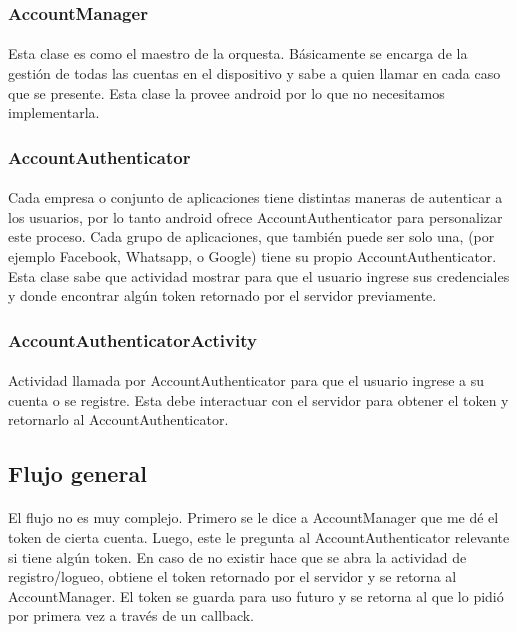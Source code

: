 \documentclass[10pt]{extarticle}
\begin{document}
\subsubsection{AccountManager}
\paragraph{}
Esta clase es como el maestro de la orquesta. Básicamente se encarga de la gestión de todas las cuentas en el dispositivo y sabe a quien llamar en cada caso que se presente. Esta clase la provee android por lo que no necesitamos implementarla.

\subsubsection{AccountAuthenticator}
\paragraph{}
Cada empresa o conjunto de aplicaciones tiene distintas maneras de autenticar a los usuarios, por lo tanto android ofrece AccountAuthenticator para personalizar este proceso. Cada grupo de aplicaciones, que también puede ser solo una, (por ejemplo Facebook, Whatsapp, o Google) tiene su propio AccountAuthenticator. Esta clase sabe que actividad mostrar para que el usuario ingrese sus credenciales y donde encontrar algún token retornado por el servidor previamente.

\subsubsection{AccountAuthenticatorActivity}
\paragraph{}
Actividad llamada por AccountAuthenticator para que el usuario ingrese a su cuenta o se registre. Esta debe interactuar con el servidor para obtener el token y retornarlo al AccountAuthenticator.


\subsection{Flujo general}

\paragraph{}
El flujo no es muy complejo. Primero se le dice a AccountManager que me dé el token de cierta cuenta. Luego, este le pregunta al AccountAuthenticator relevante si tiene algún token. En caso de no existir hace que se abra la actividad de registro/logueo, obtiene el token retornado por el servidor y se retorna al AccountManager. El token se guarda para uso futuro y se retorna al que lo pidió por primera vez a través de un callback.
\end{document}
